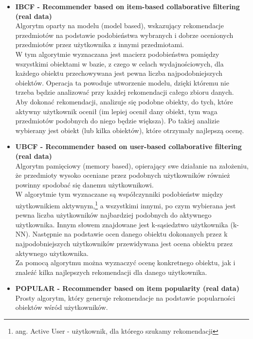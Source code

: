 \documentclass[12pt, a4paper]{article}
\begin{document}
\begin{itemize}
\item \textbf{IBCF - Recommender based on item-based collaborative filtering (real data)}\\
Algorytm oparty na modelu (model based), wskazujący rekomendacje przedmiotów na podstawie podobieństwa wybranych i dobrze ocenionych przedmiotów przez użytkownika z innymi przedmiotami.\\
W tym algorytmie wyznaczana jest macierz podobieństwa pomiędzy wszystkimi obiektami w bazie, z czego w celach wydajnościowych, dla każdego obiektu przechowywana jest pewna liczba najpodobniejszych obiektów. Operacja ta powoduje utworzenie modelu, dzięki któremu nie trzeba będzie analizować przy każdej rekomendacji całego zbioru danych.\\
Aby dokonać rekomendacji, analizuje się podobne obiekty, do tych, które aktywny użytkownik ocenił (im lepiej ocenił dany obiekt, tym waga przedmiotów podobnych do niego będzie większa). Po takiej analizie wybierany jest obiekt (lub kilka obiektów), które otrzymały najlepszą ocenę.

\item \textbf{UBCF - Recommender based on user-based collaborative filtering (real data)}\\
Algorytm pamięciowy (memory based), opierający swe działanie na założeniu, że przedmioty wysoko oceniane przez podobnych użytkowników również powinny spodobać się danemu użytkownikowi.\\
W algorytmie tym wyznaczane są współczynniki podobieństw między użytkownikiem aktywnym,\footnote{ang. Active User - użytkownik, dla którego szukamy rekomendacji} a wszystkimi innymi, po czym wybierana jest pewna liczba użytkowników najbardziej podobnych do aktywnego użytkownika. Innym słowem znajdowane jest k-sąsiedztwo użytkownika (k-NN). Następnie na podstawie ocen danego obiektu dokonanych przez k najpodobniejszych użytkowników przewidywana jest ocena obiektu przez aktywnego użytkownika.\\
Za pomocą algorytmu można wyznaczyć ocenę konkretnego obiektu, jak i znaleźć kilka najlepszych rekomendacji dla danego użytkownika.

\item \textbf{POPULAR - Recommender based on item popularity (real data)}\\
Prosty algorytm, który generuje rekomendacje na podstawie popularności obiektów wśród użytkowników.

\end{itemize}
\end{document}
